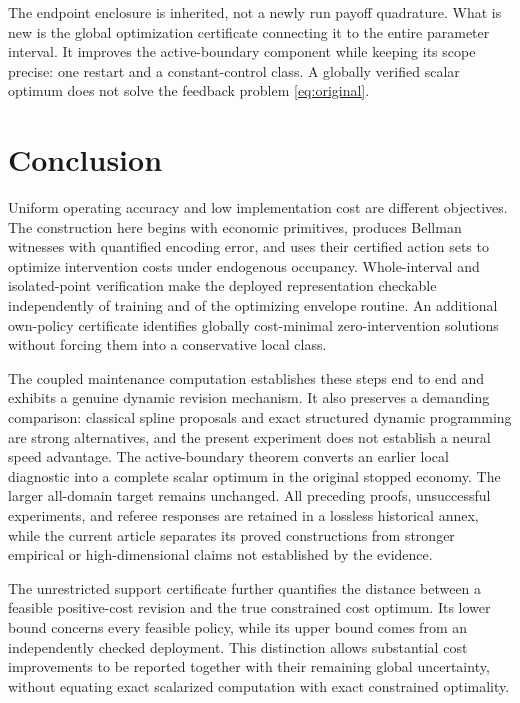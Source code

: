 The endpoint enclosure is inherited, not a newly run payoff quadrature. What is new is the global optimization certificate connecting it to the entire parameter interval. It improves the active-boundary component while keeping its scope precise: one restart and a constant-control class. A globally verified scalar optimum does not solve the feedback problem \eqref{eq:original}.

\section{Conclusion}
Uniform operating accuracy and low implementation cost are different objectives. The construction here begins with economic primitives, produces Bellman witnesses with quantified encoding error, and uses their certified action sets to optimize intervention costs under endogenous occupancy. Whole-interval and isolated-point verification make the deployed representation checkable independently of training and of the optimizing envelope routine. An additional own-policy certificate identifies globally cost-minimal zero-intervention solutions without forcing them into a conservative local class.

The coupled maintenance computation establishes these steps end to end and exhibits a genuine dynamic revision mechanism. It also preserves a demanding comparison: classical spline proposals and exact structured dynamic programming are strong alternatives, and the present experiment does not establish a neural speed advantage. The active-boundary theorem converts an earlier local diagnostic into a complete scalar optimum in the original stopped economy. The larger all-domain target remains unchanged. All preceding proofs, unsuccessful experiments, and referee responses are retained in a lossless historical annex, while the current article separates its proved constructions from stronger empirical or high-dimensional claims not established by the evidence.

The unrestricted support certificate further quantifies the distance between a feasible positive-cost revision and the true constrained cost optimum. Its lower bound concerns every feasible policy, while its upper bound comes from an independently checked deployment. This distinction allows substantial cost improvements to be reported together with their remaining global uncertainty, without equating exact scalarized computation with exact constrained optimality.
